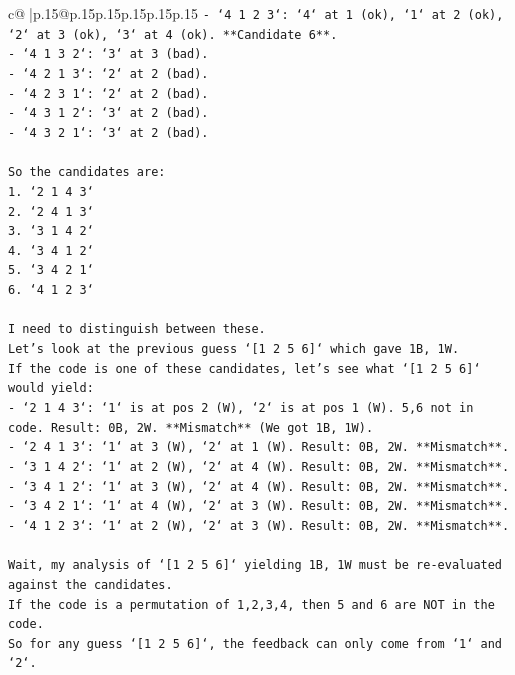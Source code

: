 \documentclass{article}
\begin{document}
{\begin{supertabular}{c@{$\;$}|p{.15\linewidth}@{}p{.15\linewidth}p{.15\linewidth}p{.15\linewidth}p{.15\linewidth}p{.15\linewidth}}
{{{\texttt{{-} `4 1 2 3`: `4` at 1 (ok), `1` at 2 (ok), `2` at 3 (ok), `3` at 4 (ok). **Candidate 6**.} \\
\texttt{{-} `4 1 3 2`: `3` at 3 (bad).} \\
\texttt{{-} `4 2 1 3`: `2` at 2 (bad).} \\
\texttt{{-} `4 2 3 1`: `2` at 2 (bad).} \\
\texttt{{-} `4 3 1 2`: `3` at 2 (bad).} \\
\texttt{{-} `4 3 2 1`: `3` at 2 (bad).} \\
\\ 
\texttt{So the candidates are:} \\
\texttt{1. `2 1 4 3`} \\
\texttt{2. `2 4 1 3`} \\
\texttt{3. `3 1 4 2`} \\
\texttt{4. `3 4 1 2`} \\
\texttt{5. `3 4 2 1`} \\
\texttt{6. `4 1 2 3`} \\
\\ 
\texttt{I need to distinguish between these.} \\
\texttt{Let's look at the previous guess `{[}1 2 5 6{]}` which gave 1B, 1W.} \\
\texttt{If the code is one of these candidates, let's see what `{[}1 2 5 6{]}` would yield:} \\
\texttt{{-} `2 1 4 3`: `1` is at pos 2 (W), `2` is at pos 1 (W). 5,6 not in code. Result: 0B, 2W. **Mismatch** (We got 1B, 1W).} \\
\texttt{{-} `2 4 1 3`: `1` at 3 (W), `2` at 1 (W). Result: 0B, 2W. **Mismatch**.} \\
\texttt{{-} `3 1 4 2`: `1` at 2 (W), `2` at 4 (W). Result: 0B, 2W. **Mismatch**.} \\
\texttt{{-} `3 4 1 2`: `1` at 3 (W), `2` at 4 (W). Result: 0B, 2W. **Mismatch**.} \\
\texttt{{-} `3 4 2 1`: `1` at 4 (W), `2` at 3 (W). Result: 0B, 2W. **Mismatch**.} \\
\texttt{{-} `4 1 2 3`: `1` at 2 (W), `2` at 3 (W). Result: 0B, 2W. **Mismatch**.} \\
\\ 
\texttt{Wait, my analysis of `{[}1 2 5 6{]}` yielding 1B, 1W must be re{-}evaluated against the candidates.} \\
\texttt{If the code is a permutation of 1,2,3,4, then 5 and 6 are NOT in the code.} \\
\texttt{So for any guess `{[}1 2 5 6{]}`, the feedback can only come from `1` and `2`.} \\
}}}
\end{supertabular}}
\end{document}
